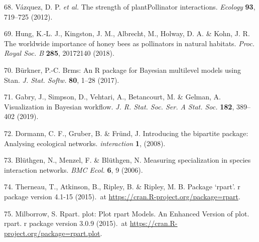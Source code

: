 \documentclass[12pt,a4paper,]{article}
\begin{document}
\hypertarget{ref-vazquez2012}{}
68. Vázquez, D. P. \emph{et al.} The strength of plantPollinator
interactions. \emph{Ecology} \textbf{93}, 719--725 (2012).

\hypertarget{ref-hung2018}{}
69. Hung, K.-L. J., Kingston, J. M., Albrecht, M., Holway, D. A. \&
Kohn, J. R. The worldwide importance of honey bees as pollinators in
natural habitats. \emph{Proc. Royal Soc. B} \textbf{285}, 20172140
(2018).

\hypertarget{ref-burkner2017}{}
70. Bürkner, P.-C. Brms: An R package for Bayesian multilevel models
using Stan. \emph{J. Stat. Softw.} \textbf{80}, 1--28 (2017).

\hypertarget{ref-gabry2019}{}
71. Gabry, J., Simpson, D., Vehtari, A., Betancourt, M. \& Gelman, A.
Visualization in Bayesian workflow. \emph{J. R. Stat. Soc. Ser. A Stat.
Soc.} \textbf{182}, 389--402 (2019).

\hypertarget{ref-dormann2008}{}
72. Dormann, C. F., Gruber, B. \& Fründ, J. Introducing the bipartite
package: Analysing ecological networks. \emph{interaction} \textbf{1},
(2008).

\hypertarget{ref-bluthgen2006}{}
73. Blüthgen, N., Menzel, F. \& Blüthgen, N. Measuring specialization in
species interaction networks. \emph{BMC Ecol.} \textbf{6}, 9 (2006).

\hypertarget{ref-therneau2015}{}
74. Therneau, T., Atkinson, B., Ripley, B. \& Ripley, M. B. Package
`rpart'. r package version 4.1-15 (2015).~at
\href{https://CRAN.R-project.org/package=rpart}{https://cran.R-project.org/package=rpart}.

\hypertarget{ref-milborrow2015}{}
75. Milborrow, S. Rpart. plot: Plot rpart Models. An Enhanced Version of
plot. rpart. r package version 3.0.9 (2015).~at
\href{https://CRAN.R-project.org/package=rpart.plot}{https://cran.R-project.org/package=rpart.plot}.
\end{document}
